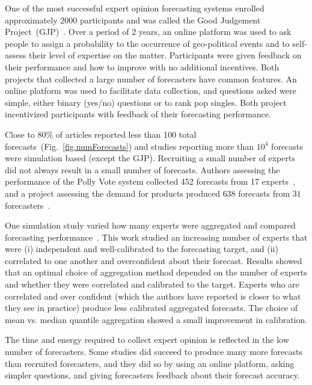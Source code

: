 \documentclass[preprint,authoryear,nonatbib]{elsarticle}
\begin{document}
One of the most successful expert opinion forecasting systems enrolled approximately $2000$ participants and was called the Good Judgement Project~(GJP)~\parencite{mellers2014psychological,ungar2012good,satopaa2014probability}.
Over a period of $2$ years, an online platform was used to ask people to assign a probability to the occurrence of geo-political events and to self-assess their level of expertise on the matter.
Participants were given feedback on their performance and how to improve with no additional incentives.
Both projects that collected a large number of forecasters have common features.
An online platform was used to facilitate data collection, and questions asked were simple, either binary (yes/no) questions or to rank pop singles. 
Both project incentivized participants with feedback of their forecasting performance.

Close to 80\% of articles reported less than 100 total forecasts~(Fig.~\ref{fig.numForecasts}) and studies reporting more than $10^4$ forecasts were simulation based (except the GJP).
Recruiting a small number of experts did not always result in a small number of forecasts.
Authors assessing the performance of the Polly Vote system collected 452 forecasts from 17 experts~\parencite{graefe2014accuracy,graefe2015accuracy,graefe2018predicting}, and
a project assessing the demand for products produced $638$ forecasts from $31$ forecasters~\parencite{alvarado2017expertise}.

One simulation study varied how many experts were aggregated and compared forecasting performance~\parencite{hora2013median}.
This work studied an increasing number of experts that were (i) independent and well-calibrated to the forecasting target, and (ii) correlated to one another and overconfident about their forecast.
Results showed that an optimal choice of aggregation method depended on the number of experts and whether they were correlated and calibrated to the target.
Experts who are correlated and over confident (which the authors have reported is closer to what they see in practice) produce less calibrated aggregated forecasts.
The choice of mean vs. median quantile aggregation showed a small improvement in calibration.

The time and energy required to collect expert opinion is reflected in the low number of forecasters. 
Some studies did succeed to produce many more forecasts than recruited forecasters, and they did so by using an online platform, asking simpler questions, and giving forecasters feedback about their forecast accuracy.
\end{document}
